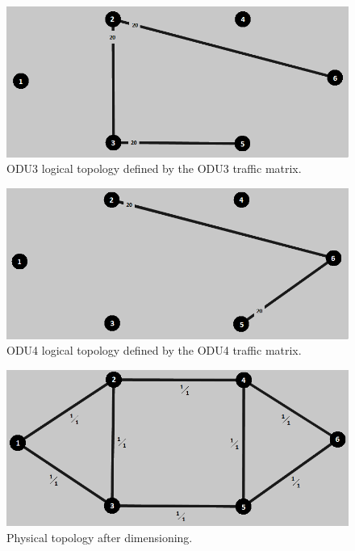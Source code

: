 \begin{figure}[H]
\centering
\includegraphics[width=13cm]{sdf/heuristic/opaque_protection/high/logical_topology_odu3_high}
\caption{ODU3 logical topology defined by the ODU3 traffic matrix.}
\label{logical_ODU3_protec_ref_high_heuristic}
\end{figure}

\begin{figure}[H]
\centering
\includegraphics[width=13cm]{sdf/heuristic/opaque_protection/high/logical_topology_odu4_high}
\caption{ODU4 logical topology defined by the ODU4 traffic matrix.}
\label{logical_ODU4_protec_ref_high_heuristic}
\end{figure}

\begin{figure}[H]
\centering
\includegraphics[width=13cm]{sdf/heuristic/opaque_protection/high/physical_topology_high}
\caption{Physical topology after dimensioning.}
\label{physical_topology_protec_ref_high_heuristic}
\end{figure}

